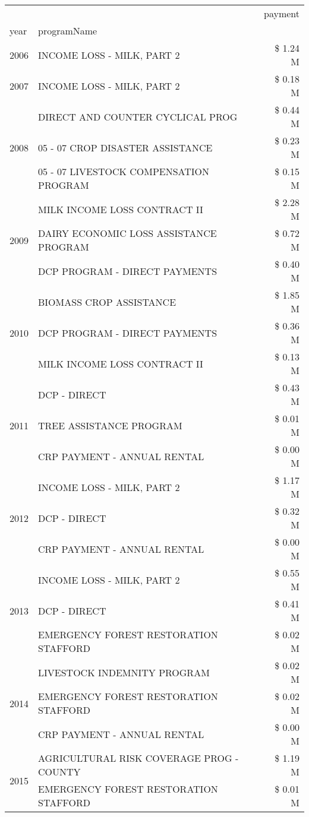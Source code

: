 \begin{tabular}{llr}
\toprule
 &  & payment \\
year & programName &  \\
\midrule
2006 & INCOME LOSS - MILK, PART 2 & \$ 1.24 M \\
\cline{1-3}
2007 & INCOME LOSS - MILK, PART 2 & \$ 0.18 M \\
\cline{1-3}
\multirow[t]{3}{*}{2008} & DIRECT AND COUNTER CYCLICAL PROG & \$ 0.44 M \\
 & 05 - 07 CROP DISASTER ASSISTANCE & \$ 0.23 M \\
 & 05 - 07 LIVESTOCK COMPENSATION PROGRAM & \$ 0.15 M \\
\cline{1-3}
\multirow[t]{3}{*}{2009} & MILK INCOME LOSS CONTRACT II & \$ 2.28 M \\
 & DAIRY ECONOMIC LOSS ASSISTANCE PROGRAM & \$ 0.72 M \\
 & DCP PROGRAM - DIRECT PAYMENTS & \$ 0.40 M \\
\cline{1-3}
\multirow[t]{3}{*}{2010} & BIOMASS CROP ASSISTANCE & \$ 1.85 M \\
 & DCP PROGRAM - DIRECT PAYMENTS & \$ 0.36 M \\
 & MILK INCOME LOSS CONTRACT II & \$ 0.13 M \\
\cline{1-3}
\multirow[t]{3}{*}{2011} & DCP - DIRECT & \$ 0.43 M \\
 & TREE ASSISTANCE PROGRAM & \$ 0.01 M \\
 & CRP PAYMENT - ANNUAL RENTAL & \$ 0.00 M \\
\cline{1-3}
\multirow[t]{3}{*}{2012} & INCOME LOSS - MILK, PART 2 & \$ 1.17 M \\
 & DCP - DIRECT & \$ 0.32 M \\
 & CRP PAYMENT - ANNUAL RENTAL & \$ 0.00 M \\
\cline{1-3}
\multirow[t]{3}{*}{2013} & INCOME LOSS - MILK, PART 2 & \$ 0.55 M \\
 & DCP - DIRECT & \$ 0.41 M \\
 & EMERGENCY FOREST RESTORATION STAFFORD & \$ 0.02 M \\
\cline{1-3}
\multirow[t]{3}{*}{2014} & LIVESTOCK INDEMNITY PROGRAM & \$ 0.02 M \\
 & EMERGENCY FOREST RESTORATION STAFFORD & \$ 0.02 M \\
 & CRP PAYMENT - ANNUAL RENTAL & \$ 0.00 M \\
\cline{1-3}
\multirow[t]{3}{*}{2015} & AGRICULTURAL RISK COVERAGE PROG - COUNTY & \$ 1.19 M \\
 & EMERGENCY FOREST RESTORATION STAFFORD & \$ 0.01 M \\

\end{tabular}
